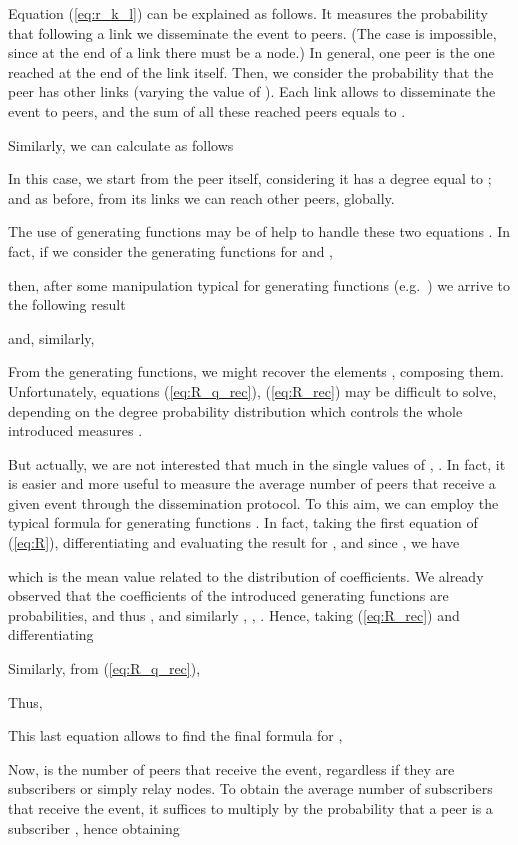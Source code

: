 \documentclass[10pt, conference, compsocconf]{IEEEtran}
\begin{document}
Equation (\ref{eq:r_k_l}) can be explained as follows. It measures the probability that following a link we disseminate the event to  peers. (The case  is impossible, since at the end of a link there must be a node.) In general, one peer is the one reached at the end of the link itself. Then, we consider the probability that the peer has other  links (varying the value of ). Each link  allows to disseminate the event to  peers, and the sum of all these reached peers equals to .

Similarly, we can calculate  as follows

In this case, we start from the peer itself, considering it has a degree equal to ; and as before, from its  links we can reach  other peers, globally.

The use of generating functions may be of help to handle these two equations \cite{Wilf_1994}. In fact, if we consider the generating functions for  and ,

then, after some manipulation typical for generating functions (e.g.~\cite{newmanHandbook}) we arrive to the following result

and, similarly,

From the generating functions, we might recover the elements ,  composing them. Unfortunately, equations (\ref{eq:R_q_rec}), (\ref{eq:R_rec}) may be difficult to solve, depending on the degree probability distribution  which controls the whole introduced measures \cite{newmanHandbook}.

But actually, we are not interested that much in the single values of , . In fact, it is easier and more useful to measure the average number  of peers that receive a given event through the dissemination protocol. To this aim, we can employ the typical formula for generating functions
 \cite{Wilf_1994}.
In fact, taking the first equation of (\ref{eq:R}), differentiating and evaluating the result for , and since , we have 

which is the mean value related to the distribution of  coefficients.
We already observed that the coefficients of the introduced generating functions are probabilities, and thus
, and similarly , , . Hence, taking (\ref{eq:R_rec}) and differentiating 

Similarly, from (\ref{eq:R_q_rec}),

Thus,

This last equation allows to find the final formula for ,


Now,  is the number of peers that receive the event, regardless if they are subscribers or simply relay nodes. To obtain the average number of subscribers  that receive the event, it suffices to multiply  by the probability that a peer is a subscriber , hence obtaining
\end{document}

